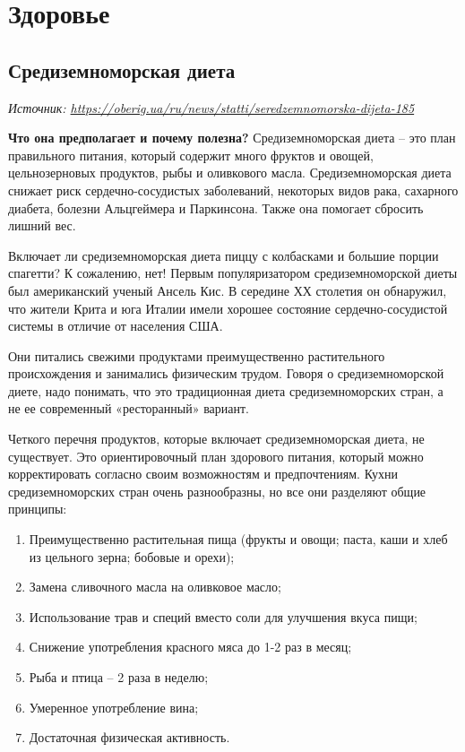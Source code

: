 \chapter{Здоровье}

\section{Средиземноморская диета}
\textit{Источник: \url{https://oberig.ua/ru/news/statti/seredzemnomorska-dijeta-185}}

\textbf{Что она предполагает и почему полезна?} Средиземноморская диета – это план правильного питания, который содержит много фруктов и овощей, цельнозерновых продуктов, рыбы и оливкового масла. Средиземноморская диета снижает риск сердечно-сосудистых заболеваний, некоторых видов рака, сахарного диабета, болезни Альцгеймера и Паркинсона. Также она помогает сбросить лишний вес.

Включает ли средиземноморская диета пиццу с колбасками и большие порции спагетти? К сожалению, нет! Первым популяризатором средиземноморской диеты был американский ученый Ансель Кис. В середине ХХ столетия он обнаружил, что жители Крита и юга Италии имели хорошее состояние сердечно-сосудистой системы в отличие от населения США.

Они питались свежими продуктами преимущественно растительного происхождения и занимались физическим трудом. Говоря о средиземноморской диете, надо понимать, что это традиционная диета средиземноморских стран, а не ее современный «ресторанный» вариант.

Четкого перечня продуктов, которые включает средиземноморская диета, не существует. Это ориентировочный план здорового питания, который можно корректировать согласно своим возможностям и предпочтениям. Кухни средиземноморских стран очень разнообразны, но все они разделяют общие принципы:

\begin{enumerate}
    \item Преимущественно растительная пища (фрукты и овощи; паста, каши и хлеб из цельного зерна; бобовые и орехи);
    \item Замена сливочного масла на оливковое масло;
    \item Использование трав и специй вместо соли для улучшения вкуса пищи;
    \item Снижение употребления красного мяса до 1-2 раз в месяц;
    \item Рыба и птица – 2 раза в неделю;
    \item Умеренное употребление вина;
    \item Достаточная физическая активность.
\end{enumerate}

